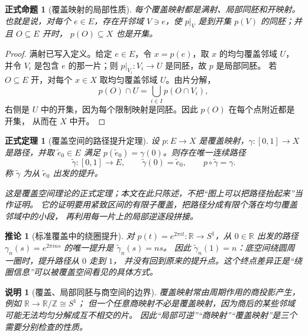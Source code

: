 \documentclass[UTF8,fontset=none,a4paper,11pt]{ctexart}
\theoremstyle{foundation-definition}
\theoremstyle{foundation-theorem}
\newtheorem{theorem}[definition]{正式定理}
\theoremstyle{foundation-proposition}
\newtheorem{proposition}[definition]{正式命题}
\theoremstyle{foundation-example}
\theoremstyle{foundation-remark}
\newtheorem{remark}[definition]{说明}
\theoremstyle{foundation-theorem}
\newtheorem{corollary}[definition]{推论}
\begin{document}
\begin{proposition}[覆盖映射的局部性质]\label{prop:covering-local-homeomorphism}
每个覆盖映射都是满射、局部同胚和开映射。也就是说，对每个 \(e\in E\)，存在开邻域
\(V\ni e\)，使 \(p|_V\) 是到开集 \(p(V)\) 的同胚；并且 \(O\subseteq E\) 开时，
\(p(O)\subseteq X\) 也是开集。
\end{proposition}

\begin{proof}
满射已写入定义。给定 \(e\in E\)，令 \(x=p(e)\)，取 \(x\) 的均匀覆盖邻域 \(U\)，
并令 \(V_i\) 是包含 \(e\) 的那一片；则 \(p|_{V_i}:V_i\to U\) 是同胚，故 \(p\) 是局部同胚。
若 \(O\subseteq E\) 开，对每个 \(x\in X\) 取均匀覆盖邻域 \(U\)。由片分解，
\[
p(O)\cap U=\bigcup_{i\in I}p(O\cap V_i),
\]
右侧是 \(U\) 中的开集，因为每个限制映射是同胚。因此 \(p(O)\) 在每个点附近都是开集，
从而在 \(X\) 中开。
\end{proof}

\begin{theorem}[覆盖空间的路径提升定理]\label{thm:path-lifting}
设 \(p:E\to X\) 是覆盖映射，\(\gamma:[0,1]\to X\) 是路径，并取
\(\widetilde e_0\in E\) 满足 \(p(\widetilde e_0)=\gamma(0)\)。则存在唯一连续路径
\[
\widetilde\gamma:[0,1]\to E,
\qquad \widetilde\gamma(0)=\widetilde e_0,
\qquad p\circ\widetilde\gamma=\gamma.
\]
称 \(\widetilde\gamma\) 为从 \(\widetilde e_0\) 出发的提升。

这是覆盖空间理论的正式定理；本文在此只陈述，不把“图上可以把路径抬起来”当作证明。
它的证明要用紧致区间的有限子覆盖，把路径分成有限个落在均匀覆盖邻域中的小段，
再利用每一片上的局部逆逐段拼接。
\end{theorem}

\begin{corollary}[标准覆盖中的绕圈提升]
对 \(p(t)=e^{2\pi i t}:\mathbb R\to S^1\)，从 \(0\in\mathbb R\) 出发的路径
\(\gamma_n(s)=e^{2\pi i ns}\) 的唯一提升是 \(\widetilde\gamma_n(s)=ns\)。
因此 \(\widetilde\gamma_n(1)=n\)：底空间绕圆周一圈时，提升路径从 \(0\) 走到 \(1\)，
并没有回到原来的提升点。这个终点差异正是“绕圈信息”可以被覆盖空间看见的具体方式。
\end{corollary}

\begin{remark}[覆盖、局部同胚与商空间的边界]
覆盖映射常由周期作用的商投影产生，例如 \(\mathbb R\to\mathbb R/\mathbb Z\cong S^1\)；
但一个任意商映射不必是覆盖映射，因为商后的某些邻域可能无法均匀分解成互不相交的片。
因此“局部可逆”“商映射”“覆盖映射”是三个需要分别检查的性质。
\end{remark}
\end{document}
